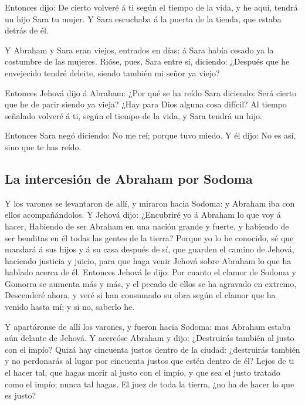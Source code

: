  Entonces dijo: De cierto volveré á ti según el tiempo de
la vida, y he aquí, tendrá un hijo Sara tu mujer. Y Sara escuchaba á la
puerta de la tienda, que estaba detrás de él.

 Y Abraham y Sara eran viejos, entrados en días: á Sara
había cesado ya la costumbre de las mujeres.  Rióse,
pues, Sara entre sí, diciendo: ¿Después que he envejecido tendré
deleite, siendo también mi señor ya viejo?

 Entonces Jehová dijo á Abraham: ¿Por qué se ha reído
Sara diciendo: Será cierto que he de parir siendo ya vieja?
 ¿Hay para Dios alguna cosa difícil? Al tiempo señalado
volveré á ti, según el tiempo de la vida, y Sara tendrá un hijo.

 Entonces Sara negó diciendo: No me reí; porque tuvo
miedo. Y él dijo: No es así, sino que te has reído.

\hypertarget{la-intercesiuxf3n-de-abraham-por-sodoma}{%
\subsection{La intercesión de Abraham por
Sodoma}\label{la-intercesiuxf3n-de-abraham-por-sodoma}}

 Y los varones se levantaron de allí, y miraron hacia
Sodoma: y Abraham iba con ellos acompañándolos.  Y Jehová
dijo: ¿Encubriré yo á Abraham lo que voy á hacer, 
Habiendo de ser Abraham en una nación grande y fuerte, y habiendo de ser
benditas en él todas las gentes de la tierra?  Porque yo
lo he conocido, sé que mandará á sus hijos y á su casa después de sí,
que guarden el camino de Jehová, haciendo justicia y juicio, para que
haga venir Jehová sobre Abraham lo que ha hablado acerca de él.
 Entonces Jehová le dijo: Por cuanto el clamor de Sodoma
y Gomorra se aumenta más y más, y el pecado de ellos se ha agravado en
extremo,  Descenderé ahora, y veré si han consumado su
obra según el clamor que ha venido hasta mí; y si no, saberlo he.

 Y apartáronse de allí los varones, y fueron hacia
Sodoma: mas Abraham estaba aún delante de Jehová.  Y
acercóse Abraham y dijo: ¿Destruirás también al justo con el impío?
 Quizá hay cincuenta justos dentro de la ciudad:
¿destruirás también y no perdonarás al lugar por cincuenta justos que
estén dentro de él?  Lejos de ti el hacer tal, que hagas
morir al justo con el impío, y que sea el justo tratado como el impío;
nunca tal hagas. El juez de toda la tierra, ¿no ha de hacer lo que es
justo?

